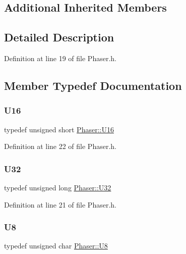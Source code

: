 \subsection*{Additional Inherited Members}


\subsection{Detailed Description}


Definition at line 19 of file Phaser.\+h.



\subsection{Member Typedef Documentation}
\mbox{\label{classPhaser_acadd65d66e8b38a16ad37a23834ee513}} 
\subsubsection{\texorpdfstring{U16}{U16}}
{\footnotesize\ttfamily typedef unsigned short \hyperlink{classPhaser_acadd65d66e8b38a16ad37a23834ee513}{Phaser\+::\+U16}}



Definition at line 22 of file Phaser.\+h.

\mbox{\label{classPhaser_a733b5d40a397fc633db055248c76a23f}} 
\subsubsection{\texorpdfstring{U32}{U32}}
{\footnotesize\ttfamily typedef unsigned long \hyperlink{classPhaser_a733b5d40a397fc633db055248c76a23f}{Phaser\+::\+U32}}



Definition at line 21 of file Phaser.\+h.

\mbox{\label{classPhaser_a09f745e43da83ab27286e69179755361}} 
\subsubsection{\texorpdfstring{U8}{U8}}
{\footnotesize\ttfamily typedef unsigned char \hyperlink{classPhaser_a09f745e43da83ab27286e69179755361}{Phaser\+::\+U8}}



